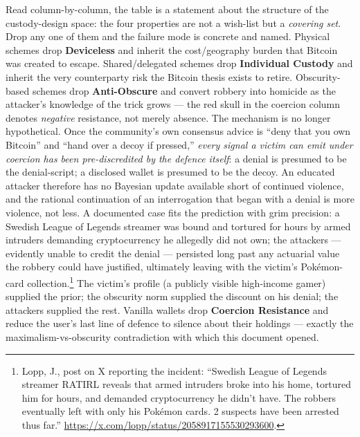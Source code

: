 \documentclass[a4paper,11pt]{article}
\begin{document}
\noindent Read column-by-column, the table is a statement about the structure of the custody-design space: the four properties are not a wish-list but a \emph{covering set}. Drop any one of them and the failure mode is concrete and named. Physical schemes drop \textbf{Deviceless} and inherit the cost/geography burden that Bitcoin was created to escape. Shared/delegated schemes drop \textbf{Individual Custody} and inherit the very counterparty risk the Bitcoin thesis exists to retire. Obscurity-based schemes drop \textbf{Anti-Obscure} and convert robbery into homicide as the attacker's knowledge of the trick grows --- the red skull in the coercion column denotes \emph{negative} resistance, not merely absence. The mechanism is no longer hypothetical. Once the community's own consensus advice is ``deny that you own Bitcoin'' and ``hand over a decoy if pressed,'' \emph{every signal a victim can emit under coercion has been pre-discredited by the defence itself}: a denial is presumed to be the denial-script; a disclosed wallet is presumed to be the decoy. An educated attacker therefore has no Bayesian update available short of continued violence, and the rational continuation of an interrogation that began with a denial is more violence, not less. A documented case fits the prediction with grim precision: a Swedish League of Legends streamer was bound and tortured for hours by armed intruders demanding cryptocurrency he allegedly did not own; the attackers --- evidently unable to credit the denial --- persisted long past any actuarial value the robbery could have justified, ultimately leaving with the victim's Pokémon-card collection.\footnote{Lopp, J., post on X reporting the incident: ``Swedish League of Legends streamer RATIRL reveals that armed intruders broke into his home, tortured him for hours, and demanded cryptocurrency he didn't have. The robbers eventually left with only his Pok\'emon cards. 2 suspects have been arrested thus far.'' \url{https://x.com/lopp/status/2058917155530293600}.} The victim's profile (a publicly visible high-income gamer) supplied the prior; the obscurity norm supplied the discount on his denial; the attackers supplied the rest. Vanilla wallets drop \textbf{Coercion Resistance} and reduce the user's last line of defence to silence about their holdings --- exactly the maximalism-vs-obscurity contradiction with which this document opened.
\end{document}
